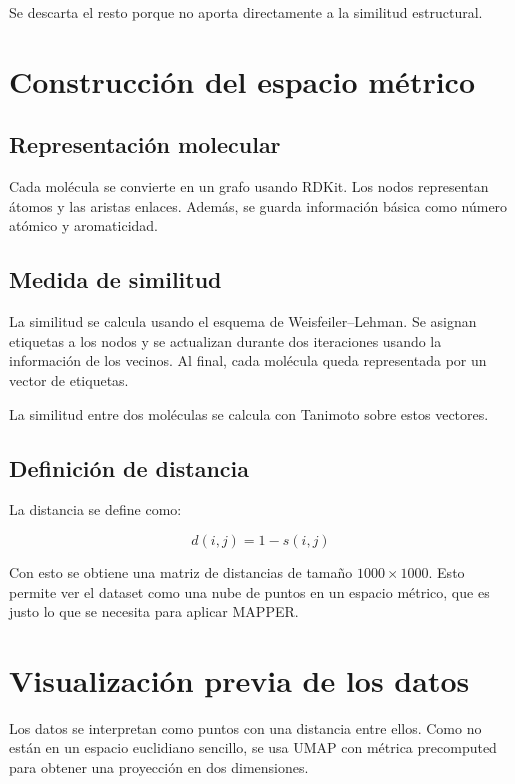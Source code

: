 \documentclass[12pt]{article}
\begin{document}
Se descarta el resto porque no aporta directamente a la similitud estructural.

\section{Construcci\'on del espacio m\'etrico}

\subsection{Representaci\'on molecular}

Cada molécula se convierte en un grafo usando RDKit. Los nodos representan átomos y las aristas enlaces. Además, se guarda información básica como número atómico y aromaticidad.

\subsection{Medida de similitud}

La similitud se calcula usando el esquema de Weisfeiler--Lehman. Se asignan etiquetas a los nodos y se actualizan durante dos iteraciones usando la información de los vecinos. Al final, cada molécula queda representada por un vector de etiquetas.

La similitud entre dos moléculas se calcula con Tanimoto sobre estos vectores.

\subsection{Definici\'on de distancia}

La distancia se define como:

\[
d(i,j) = 1 - s(i,j)
\]

Con esto se obtiene una matriz de distancias de tamaño $1000 \times 1000$. Esto permite ver el dataset como una nube de puntos en un espacio métrico, que es justo lo que se necesita para aplicar MAPPER.

\section{Visualizaci\'on previa de los datos}

Los datos se interpretan como puntos con una distancia entre ellos. Como no están en un espacio euclidiano sencillo, se usa UMAP con métrica precomputed para obtener una proyección en dos dimensiones.
\end{document}
